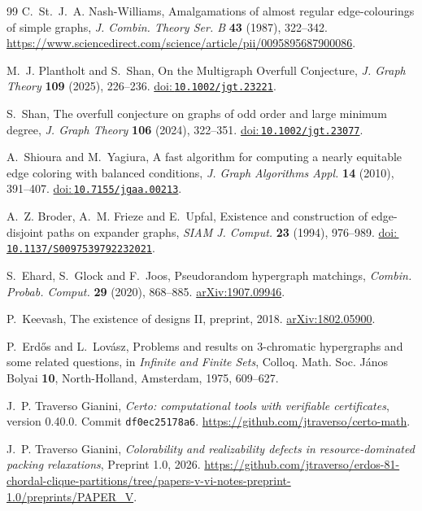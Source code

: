 \documentclass[11pt]{article}
\begin{document}
\begin{thebibliography}{99}
C.~St.~J.~A. Nash-Williams,
Amalgamations of almost regular edge-colourings of simple graphs,
\emph{J. Combin. Theory Ser. B} \textbf{43} (1987), 322--342. \url{https://www.sciencedirect.com/science/article/pii/0095895687900086}.


M.~J. Plantholt and S.~Shan,
On the Multigraph Overfull Conjecture,
\emph{J. Graph Theory} \textbf{109} (2025), 226--236.
\href{https://doi.org/10.1002/jgt.23221}{doi:\,\nolinkurl{10.1002/jgt.23221}}.

S.~Shan,
The overfull conjecture on graphs of odd order and large minimum degree,
\emph{J. Graph Theory} \textbf{106} (2024), 322--351. \href{https://doi.org/10.1002/jgt.23077}{doi:\,\nolinkurl{10.1002/jgt.23077}}.

A.~Shioura and M.~Yagiura,
A fast algorithm for computing a nearly equitable edge coloring with balanced conditions,
\emph{J. Graph Algorithms Appl.} \textbf{14} (2010), 391--407.
\href{https://doi.org/10.7155/jgaa.00213}{doi:\,\nolinkurl{10.7155/jgaa.00213}}.

A.~Z. Broder, A.~M. Frieze and E.~Upfal,
Existence and construction of edge-disjoint paths on expander graphs,
\emph{SIAM J. Comput.} \textbf{23} (1994), 976--989.
\href{https://doi.org/10.1137/S0097539792232021}{doi:\,\nolinkurl{10.1137/S0097539792232021}}.

S.~Ehard, S.~Glock and F.~Joos,
Pseudorandom hypergraph matchings,
\emph{Combin. Probab. Comput.} \textbf{29} (2020), 868--885.
\href{https://arxiv.org/abs/1907.09946}{arXiv:1907.09946}.

P.~Keevash, The existence of designs II,
preprint, 2018.
\href{https://arxiv.org/abs/1802.05900}{arXiv:1802.05900}.

P.~Erd\H{o}s and L.~Lov\'asz,
Problems and results on 3-chromatic hypergraphs and some related questions,
in \emph{Infinite and Finite Sets}, Colloq. Math. Soc. J\'anos Bolyai \textbf{10},
North-Holland, Amsterdam, 1975, 609--627.


J.~P. Traverso Gianini, \emph{Certo: computational tools with verifiable certificates}, version 0.40.0. Commit \texttt{df0ec25178a6}. \url{https://github.com/jtraverso/certo-math}.

J.~P. Traverso Gianini,
\emph{Colorability and realizability defects in resource-dominated packing relaxations}, Preprint 1.0, 2026.
\url{https://github.com/jtraverso/erdos-81-chordal-clique-partitions/tree/papers-v-vi-notes-preprint-1.0/preprints/PAPER_V}.


\end{thebibliography}
\end{document}
